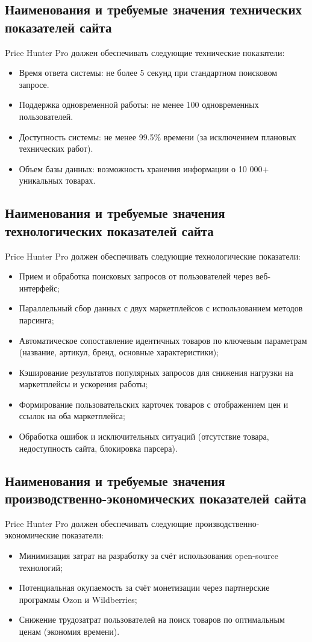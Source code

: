 \documentclass[a4paper,12pt]{article}
\begin{document}
\subsection{Наименования и требуемые значения технических показателей сайта}
Price Hunter Pro должен обеспечивать следующие технические показатели:
\begin{itemize}
    \item Время ответа системы: не более 5 секунд при стандартном поисковом запросе.
    \item Поддержка одновременной работы: не менее 100 одновременных пользователей.
    \item Доступность системы: не менее 99.5\% времени (за исключением плановых технических работ).
    \item Объем базы данных: возможность хранения информации о 10 000+ уникальных товарах.
\end{itemize}

\subsection{Наименования и требуемые значения технологических показателей сайта}
Price Hunter Pro должен обеспечивать следующие технологические показатели:
\begin{itemize}
    \item Прием и обработка поисковых запросов от пользователей через веб-интерфейс;
    \item Параллельный сбор данных с двух маркетплейсов с использованием методов парсинга;
    \item Автоматическое сопоставление идентичных товаров по ключевым параметрам (название, артикул, бренд, основные характеристики);
    \item Кэширование результатов популярных запросов для снижения нагрузки на маркетплейсы и ускорения работы;
    \item Формирование пользовательских карточек товаров с отображением цен и ссылок на оба маркетплейса;
    \item Обработка ошибок и исключительных ситуаций (отсутствие товара, недоступность сайта, блокировка парсера).
\end{itemize}

\subsection{Наименования и требуемые значения \\производственно-экономических показателей сайта}
Price Hunter Pro должен обеспечивать следующие производственно-экономические показатели:
\begin{itemize}
    \item Минимизация затрат на разработку за счёт использования open-source технологий;
    \item Потенциальная окупаемость за счёт монетизации через партнерские программы Ozon и Wildberries;
    \item Снижение трудозатрат пользователей на поиск товаров по оптимальным ценам (экономия времени).
\end{itemize}
\end{document}
